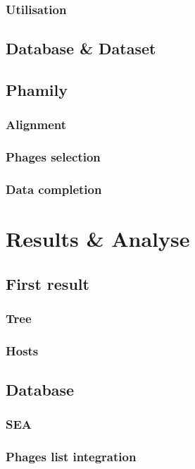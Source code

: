 \documentclass[a4paper,11pt]{report}
\begin{document}
\subsection{Utilisation}

\section{Database \& Dataset}

\section{Phamily}
\subsection{Alignment}
\subsection{Phages selection}
\subsection{Data completion}


\chapter{Results \& Analyse}

\section{First result}
\subsection{Tree}
\subsection{Hosts}

\section{Database}
\subsection{SEA}
\subsection{Phages list integration}
\end{document}
